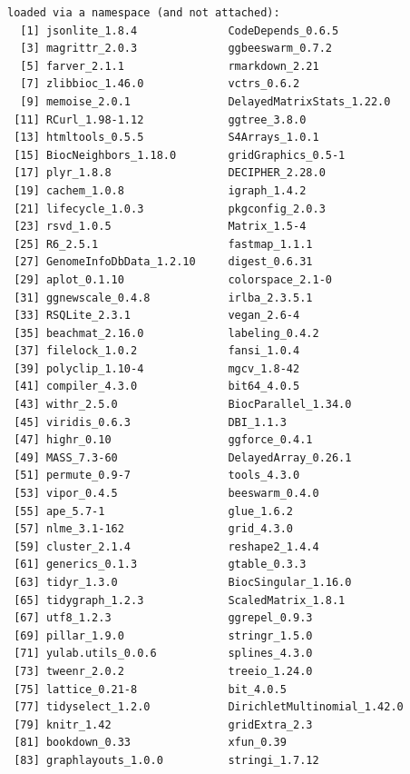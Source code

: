 \documentclass[
]{book}
\begin{document}
\begin{verbatim}
loaded via a namespace (and not attached):
  [1] jsonlite_1.8.4              CodeDepends_0.6.5          
  [3] magrittr_2.0.3              ggbeeswarm_0.7.2           
  [5] farver_2.1.1                rmarkdown_2.21             
  [7] zlibbioc_1.46.0             vctrs_0.6.2                
  [9] memoise_2.0.1               DelayedMatrixStats_1.22.0  
 [11] RCurl_1.98-1.12             ggtree_3.8.0               
 [13] htmltools_0.5.5             S4Arrays_1.0.1             
 [15] BiocNeighbors_1.18.0        gridGraphics_0.5-1         
 [17] plyr_1.8.8                  DECIPHER_2.28.0            
 [19] cachem_1.0.8                igraph_1.4.2               
 [21] lifecycle_1.0.3             pkgconfig_2.0.3            
 [23] rsvd_1.0.5                  Matrix_1.5-4               
 [25] R6_2.5.1                    fastmap_1.1.1              
 [27] GenomeInfoDbData_1.2.10     digest_0.6.31              
 [29] aplot_0.1.10                colorspace_2.1-0           
 [31] ggnewscale_0.4.8            irlba_2.3.5.1              
 [33] RSQLite_2.3.1               vegan_2.6-4                
 [35] beachmat_2.16.0             labeling_0.4.2             
 [37] filelock_1.0.2              fansi_1.0.4                
 [39] polyclip_1.10-4             mgcv_1.8-42                
 [41] compiler_4.3.0              bit64_4.0.5                
 [43] withr_2.5.0                 BiocParallel_1.34.0        
 [45] viridis_0.6.3               DBI_1.1.3                  
 [47] highr_0.10                  ggforce_0.4.1              
 [49] MASS_7.3-60                 DelayedArray_0.26.1        
 [51] permute_0.9-7               tools_4.3.0                
 [53] vipor_0.4.5                 beeswarm_0.4.0             
 [55] ape_5.7-1                   glue_1.6.2                 
 [57] nlme_3.1-162                grid_4.3.0                 
 [59] cluster_2.1.4               reshape2_1.4.4             
 [61] generics_0.1.3              gtable_0.3.3               
 [63] tidyr_1.3.0                 BiocSingular_1.16.0        
 [65] tidygraph_1.2.3             ScaledMatrix_1.8.1         
 [67] utf8_1.2.3                  ggrepel_0.9.3              
 [69] pillar_1.9.0                stringr_1.5.0              
 [71] yulab.utils_0.0.6           splines_4.3.0              
 [73] tweenr_2.0.2                treeio_1.24.0              
 [75] lattice_0.21-8              bit_4.0.5                  
 [77] tidyselect_1.2.0            DirichletMultinomial_1.42.0
 [79] knitr_1.42                  gridExtra_2.3              
 [81] bookdown_0.33               xfun_0.39                  
 [83] graphlayouts_1.0.0          stringi_1.7.12             

\end{verbatim}
\end{document}
